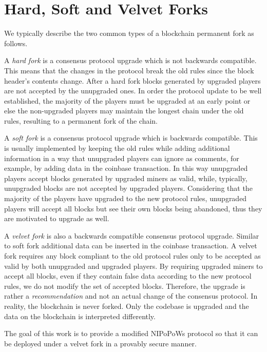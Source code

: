 \section{Hard, Soft and Velvet Forks}
We typically describe the two common types of a blockchain permanent fork as follows.

A \textit{hard fork} is a consensus protocol upgrade which is not backwards
compatible. This means that the changes in the protocol break the old rules
since the block header's contents change. After a hard fork blocks generated
by upgraded players are not accepted by the unupgraded ones. In order the
protocol update to be well established, the majority of the players must be
upgraded at an early point or else the non-upgraded players may maintain the
longest chain under the old rules, resulting to a permanent fork of the chain.

A \textit{soft fork} is a consensus protocol upgrade which is backwards compatible.
This is usually implemented by keeping the old rules while adding additional
information in a way that unupgraded players can ignore as comments, for example,
by adding data in the coinbase transaction. In this way unupgraded players
accept blocks generated by upgraded miners as valid, while, typically, unupgraded
blocks are not accepted by upgraded players. Considering that the majority of the players have upgraded to the new protocol rules, unupgraded players will accept all blocks but see their own blocks  being abandoned, thus they are motivated to upgrade as well.

A \textit{velvet fork} is also a backwards compatible consensus protocol upgrade.
Similar to soft fork additional data can be inserted in the coinbase transaction.
A velvet fork requires any block compliant to the old protocol rules only to be
accepted as valid by both unupgraded and upgraded players. By requiring upgraded
miners to accept all blocks, even if they contain false data according to the new
protocol rules, we do not modify the set of accepted blocks. Therefore, the upgrade
is rather a \textit{recommendation} and not an actual change of the consensus
protocol.  In reality, the blockchain is never forked. Only the codebase is
upgraded and the data on the blockchain is interpreted differently\cite{nipopows}.

The goal of this work is to provide a modified NIPoPoWs protocol so that it can be
deployed under a velvet fork in a provably secure manner.